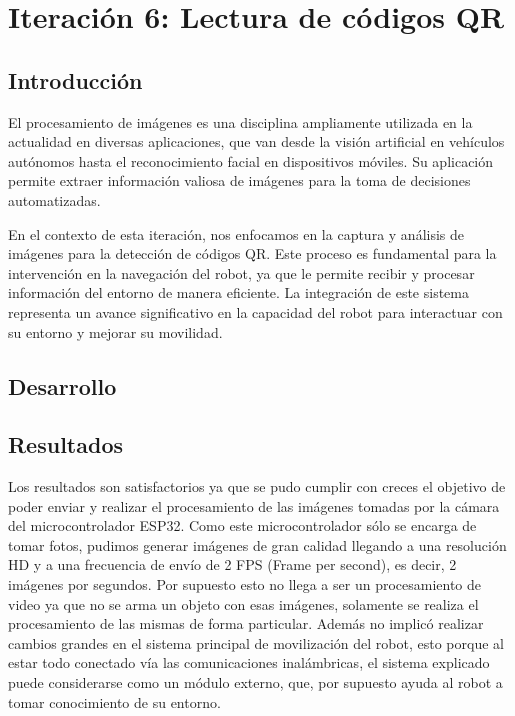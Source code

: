 \newpage
\section{Iteración 6: Lectura de códigos QR}

\subsection{Introducción}

El procesamiento de imágenes es una disciplina ampliamente utilizada en la actualidad en diversas aplicaciones, que van desde la visión artificial en vehículos autónomos hasta el reconocimiento facial en dispositivos móviles. Su aplicación permite extraer información valiosa de imágenes para la toma de decisiones automatizadas.

En el contexto de esta iteración, nos enfocamos en la captura y análisis de imágenes para la detección de códigos QR. Este proceso es fundamental para la intervención en la navegación del robot, ya que le permite recibir y procesar información del entorno de manera eficiente. La integración de este sistema representa un avance significativo en la capacidad del robot para interactuar con su entorno y mejorar su movilidad.



\subsection{Desarrollo}









\subsection{Resultados}
Los resultados son satisfactorios ya que se pudo cumplir con creces el objetivo de poder enviar y realizar el procesamiento de las imágenes tomadas por la cámara del microcontrolador ESP32. Como este microcontrolador sólo se encarga de tomar fotos, pudimos generar imágenes de gran calidad llegando a una resolución HD y a una frecuencia de envío de 2 FPS (Frame per second), es decir, 2 imágenes por segundos. Por supuesto esto no llega a ser un procesamiento de video ya que no se arma un objeto con esas imágenes, solamente se realiza el procesamiento de las mismas de forma particular.
Además no implicó realizar cambios grandes en el sistema principal de movilización del robot, esto porque al estar todo conectado vía las comunicaciones inalámbricas, el sistema explicado puede considerarse como un módulo externo, que, por supuesto ayuda al robot a tomar conocimiento de su entorno.

